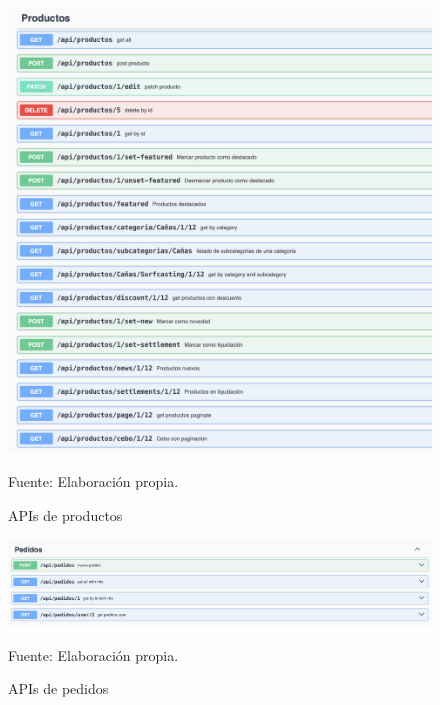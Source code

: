 \vspace{0.5cm}

\begin{figure}[H]
\begin{center}
\includegraphics[scale=0.6]{./Images/APIproductos.png}
\caption{APIs de productos} Fuente: Elaboración propia.

\label{fig:fig1}

\end{center}
\end{figure}

\begin{figure}[H]
\begin{center}
\includegraphics[scale=0.7]{./Images/APIpedidos.png}
\caption{APIs de pedidos} Fuente: Elaboración propia.

\label{fig:fig2}

\end{center}
\end{figure}

